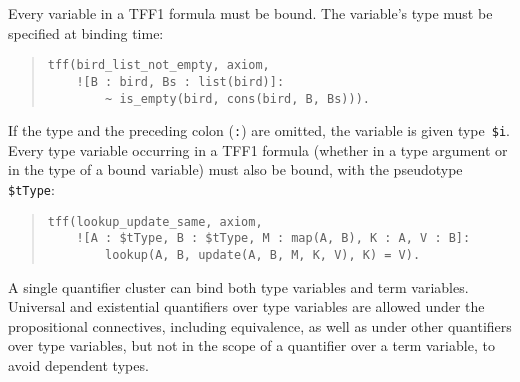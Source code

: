 Every variable in a TFF1 formula must be bound. The variable's type must be specified
at binding time:
\begin{quote}
\begin{verbatim}
tff(bird_list_not_empty, axiom,
    ![B : bird, Bs : list(bird)]:
        ~ is_empty(bird, cons(bird, B, Bs))).
\end{verbatim}
\end{quote}

If the type and the preceding colon ({\tt :}) are omitted, the variable is given
type~{\tt\$i}. Every type variable occurring in a TFF1 formula
(whether in a type argument or in the type of a bound variable)
must also be bound, with the pseudotype {\tt\$tType}:
\begin{quote}
\begin{verbatim}
tff(lookup_update_same, axiom,
    ![A : $tType, B : $tType, M : map(A, B), K : A, V : B]:
        lookup(A, B, update(A, B, M, K, V), K) = V).
\end{verbatim}
\end{quote}

A single quantifier cluster can bind both type variables and term variables.
Universal and existential quantifiers over type variables are allowed under the
propositional connectives, including equivalence, as well as under other
quantifiers over type variables, but not in the scope of a quantifier over a
term variable, to avoid dependent types.


